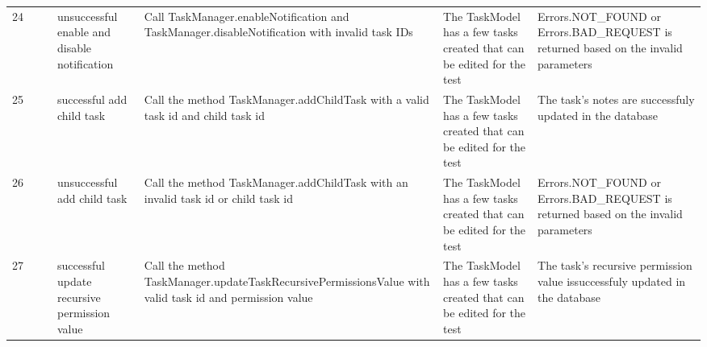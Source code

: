 \documentclass{article}
\begin{document}
{\begin{tabular}{|l|c|l|l|l|l|l|}
    \cellcolor[HTML]{FFFFFF}24                                    & \cellcolor[HTML]{FFFFFF}                                                     & \cellcolor[HTML]{FFFFFF}{\color[HTML]{11734B} Automated}        & unsuccessful enable and disable notification   & \cellcolor[HTML]{FFFFFF}Call TaskManager.enableNotification and TaskManager.disableNotification with invalid task IDs            & \cellcolor[HTML]{FFFFFF}The TaskModel has a few tasks created that can be edited for the test  & \cellcolor[HTML]{FFFFFF}Errors.NOT\_FOUND or Errors.BAD\_REQUEST is returned based on the invalid parameters                  \\ \cline{1-1} \cline{3-7}
    \cellcolor[HTML]{FFFFFF}25                                    & \cellcolor[HTML]{FFFFFF}                                                     & \cellcolor[HTML]{FFFFFF}{\color[HTML]{11734B} Automated}        & successful add child task                      & \cellcolor[HTML]{FFFFFF}Call the method TaskManager.addChildTask with a valid task id and child task id                          & \cellcolor[HTML]{FFFFFF}The TaskModel has a few tasks created that can be edited for the test  & \cellcolor[HTML]{FFFFFF}The task's notes are successfuly updated in the database                                              \\ \cline{1-1} \cline{3-7}
    \cellcolor[HTML]{FFFFFF}26                                    & \cellcolor[HTML]{FFFFFF}                                                     & \cellcolor[HTML]{FFFFFF}{\color[HTML]{11734B} Automated}        & unsuccessful add child task                    & \cellcolor[HTML]{FFFFFF}Call the method TaskManager.addChildTask with an invalid task id or child task id                        & \cellcolor[HTML]{FFFFFF}The TaskModel has a few tasks created that can be edited for the test  & \cellcolor[HTML]{FFFFFF}Errors.NOT\_FOUND or Errors.BAD\_REQUEST is returned based on the invalid parameters                  \\ \cline{1-1} \cline{3-7}
    \cellcolor[HTML]{FFFFFF}27                                    & \cellcolor[HTML]{FFFFFF}                                                     & \cellcolor[HTML]{FFFFFF}{\color[HTML]{11734B} Automated}        & successful update recursive permission value   & \cellcolor[HTML]{FFFFFF}Call the method TaskManager.updateTaskRecursivePermissionsValue with valid task id and permission value  & \cellcolor[HTML]{FFFFFF}The TaskModel has a few tasks created that can be edited for the test  & \cellcolor[HTML]{FFFFFF}The task's recursive permission value issuccessfuly updated in the database                           \\ \cline{1-1} \cline{3-7}

\end{tabular}}
\end{document}
